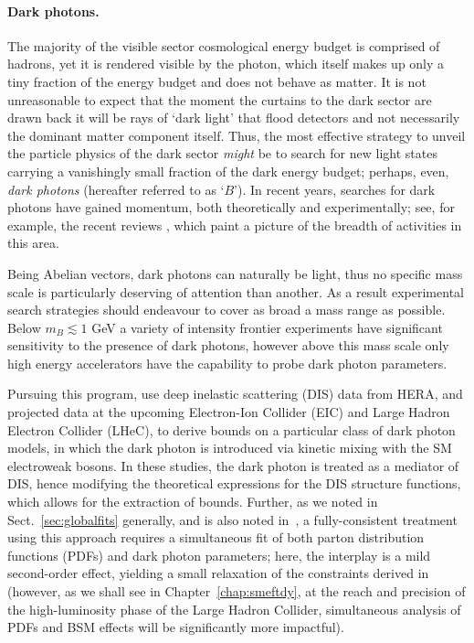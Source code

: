 \documentclass[withindex,glossary]{cam-thesis}
\begin{document}
\paragraph{Dark photons.} The majority of the visible sector cosmological energy budget is comprised of hadrons,
yet it is rendered visible by the photon, which itself makes up only a tiny fraction of the energy
budget and does not behave as matter.  It is not unreasonable to expect that the moment the curtains
to the dark sector are drawn back it will be rays of `dark light' that flood detectors and not necessarily
the dominant matter component itself. Thus, the most effective strategy to unveil the particle physics of
the dark sector \textit{might} be to search for new light states carrying a vanishingly small fraction of the dark
energy budget; perhaps, even, \textit{dark photons} (hereafter referred to as `$B$').  In recent years, searches
for dark photons have gained momentum, both theoretically and experimentally; see, for example, the recent reviews \cite{Battaglieri:2017aum,Fabbrichesi:2020wbt,Graham:2021ggy}, which paint a picture of the breadth of activities in this area.

Being Abelian vectors, dark photons can naturally be light, thus no specific mass scale is particularly
deserving of attention than another.  As a result experimental search strategies should endeavour to
cover as broad a mass range as possible.  Below $m_B \lesssim 1$ GeV a variety of intensity frontier
experiments have significant sensitivity to the presence of dark photons, however above this mass
scale only high energy accelerators have the capability to probe dark photon parameters.

Pursuing this program, \cite{Kribs:2020vyk,Thomas:2021lub,Yan:2022npz} use deep
inelastic scattering (DIS) data from HERA, and projected data at the upcoming
Electron-Ion Collider (EIC) and Large Hadron Electron Collider (LHeC), to derive bounds on a particular class of dark photon models, in which the dark photon is introduced via kinetic mixing with the
SM electroweak bosons. In these studies, the dark photon is treated as a mediator of DIS,
hence modifying the theoretical expressions for the DIS structure functions, which allows
for the extraction of bounds.
Further, as we noted in Sect.~\ref{sec:globalfits} generally, and is also noted in~\cite{Thomas:2021lub}, a fully-consistent treatment using this approach requires a simultaneous fit of both parton 
distribution functions (PDFs) and dark photon parameters;
here, the interplay is a mild second-order effect, yielding a small relaxation of the constraints derived in~\cite{Kribs:2020vyk} (however, as we shall see in Chapter~\ref{chap:smeftdy}, at the reach and precision of the high-luminosity phase of the Large Hadron Collider, simultaneous 
analysis of PDFs and BSM effects will be significantly more impactful). \\
\end{document}
